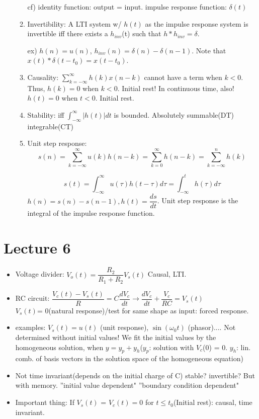 \documentclass{article}
\begin{document}
\begin{itemize}
\begin{enumerate}
cf) identity function: output = input. impulse response function: $\delta(t)$
\item Invertibility: A LTI system w/ $h(t)$ as the impulse response system is invertible iff there exists a $h_{inv}$(t) such that $h * h_{inv} = \delta$.

ex) $h(n) = u(n)$, $h_{inv}(n) = \delta(n) - \delta(n-1)$. Note that $x(t) * \delta(t-t_0) = x(t-t_0)$.
\item Causality: $\displaystyle\sum_{k=-\infty}^{\infty}{h(k)x(n-k)}$ cannot have a term when $k < 0$. Thus, $h(k) = 0$ when $k < 0$. Initial rest!
              In continuous time, also! $h(t) = 0$ when $t < 0$. Initial rest.
\item Stability: iff $\displaystyle\int_{-\infty}^{\infty}{|h(t)|dt}$ is bounded. Absolutely summable(DT) integrable(CT)
\item Unit step response: 
\[s(n) = \sum_{k=-\infty}^{\infty}{u(k)h(n-k)} = \sum_{k=0} ^{\infty}{h(n-k)} = \sum_{k=-\infty}^{n}{h(k)}\]

                       \[s(t) = \int_{-\infty}^ {\infty}{u(\tau)h(t-\tau)d\tau} = \int_{-\infty}^ {t}{h(\tau)d\tau}\]
$h(n) = s(n) - s(n-1), h(t) = \dfrac{ds}{dt}$. Unit step response is the integral of the impulse response function.
\end{enumerate}
\end{itemize}
\section{Lecture 6}
\begin{itemize}
\item Voltage divider: $V_o(t) = \dfrac{R_2}{R_1+R_2}V_s(t)$
Causal, LTI.
\item RC circuit: $\dfrac{V_c(t)-V_s(t)}{R} = C\dfrac{dV_c}{dt} \rightarrow \dfrac{dV_c}{dt} + \dfrac{V_c}{RC} = V_s(t)$\\
$V_s(t) $= 0(natural response)/test for same shape as input: forced response.
\item examples: $V_s(t) = u(t)$ (unit response), $\sin(\omega_0t)$ (phasor).... Not determined without initial values!
We fit the initial values by the homogeneous solution, when $y = y_p + y_h $($y_p$: solution with $V_c$(0) = 0. $y_h$: lin. comb. of basis vectors in the solution space of the homogeneous equation)

\item Not time invariant(depends on the initial charge of C)
stable? invertible? But with memory. 
''initial value dependent" ''boundary condition dependent"
\item Important thing: If $V_s(t)$ = $V_c(t) = 0$ for $t \leq t_0$(Initial rest): causal, time invariant.
\end{itemize}
\end{document}
